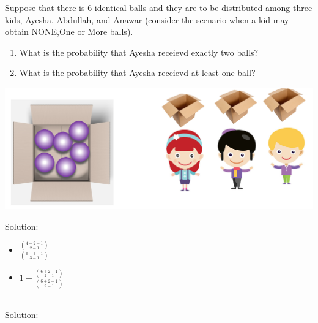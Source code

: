 \documentclass[compress]{beamer}
\begin{document}
\begin{frame}\frametitle{}
Suppose that there is 6 identical balls and they are to be distributed among three kids,  Ayesha, Abdullah, and Anawar  ({\tiny consider the scenario when a kid may obtain NONE,One or More balls}).  
\begin{enumerate}
\item What is the probability that Ayesha receievd exactly two balls?\\
\item  What is the probability that Ayesha receievd at least  one ball?\\
\end{enumerate}

\includegraphics[scale=.32]{figs/6PurpleBass3kids.png}


\pause
{\tiny Solution: 
\begin{itemize}
\item $\frac{ {{4+2-1}\choose {2-1} } }{ {{6+3-1}\choose {3-1}}  }$\item $1- \frac{ {{6+2-1}\choose {2-1} } }{ {{6+2-1}\choose {2-1}}  }$
\end{itemize} 
}
\vspace{.5in}
\end{frame}







\begin{frame}
\\

{\tiny
 Solution:  }
\vspace{2in}

\end{frame}
\end{document}
